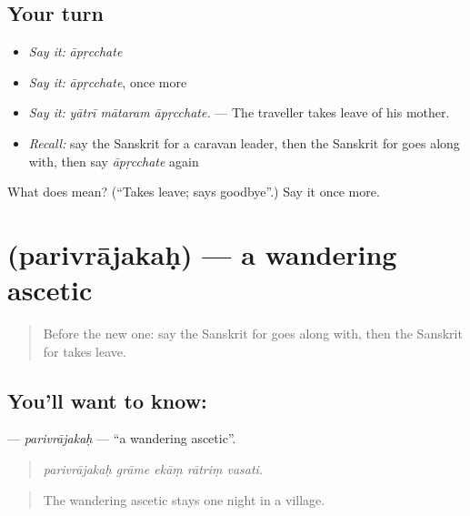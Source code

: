 \subsection*{Your turn}
\begin{itemize}
\raggedright
  \item \emph{Say it:} \emph{āpṛcchate}
  \item \emph{Say it:} \emph{āpṛcchate}, once more
  \item \emph{Say it:} \emph{yātrī mātaram āpṛcchate.} — The traveller takes leave of his mother.
  \item \emph{Recall:} say the Sanskrit for a caravan leader, then the Sanskrit for goes along with, then say \emph{āpṛcchate} again
\end{itemize}

\begin{tcolorbox}[breakable,colback=teal!4,colframe=teal!35!black,title={Before you move on}]
What does  mean? (\textquotedblleft{}Takes leave; says goodbye\textquotedblright{}.) Say it once more.
\end{tcolorbox}
\section[\texorpdfstring{\sk{परिव्राजकः} (parivrājakaḥ)}{परिव्राजकः (parivrājakaḥ)}]{ (parivrājakaḥ) — a wandering ascetic}

\label{lesson:SA-C395-parivrajakah}



\begin{quote}
Before the new one: say the Sanskrit for goes along with, then the Sanskrit for takes leave.
\end{quote}

\subsection*{You'll want to know: }
\textbf{} — \emph{parivrājakaḥ} — \textquotedblleft{}a wandering ascetic\textquotedblright{}.

\begin{quote}
    
\end{quote}

\begin{quote}
\emph{parivrājakaḥ grāme ekāṃ rātriṃ vasati.}
\end{quote}

\begin{quote}
The wandering ascetic stays one night in a village.
\end{quote}

